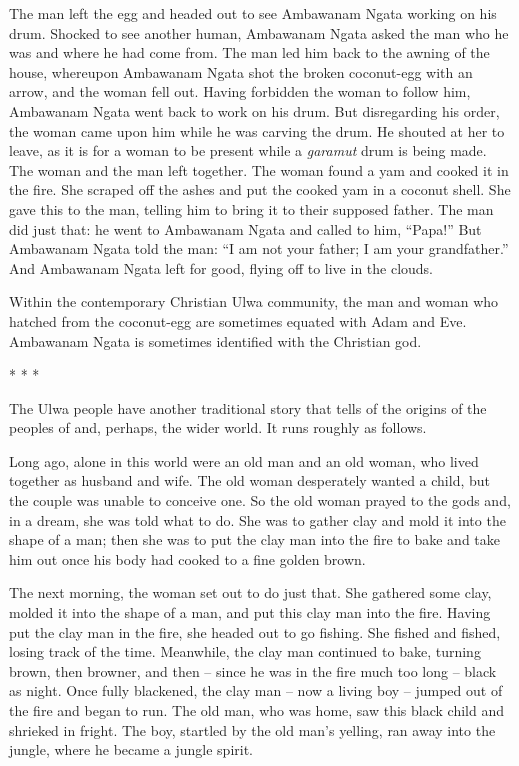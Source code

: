   The man left the egg and headed out to see Ambawanam Ngata working on his drum. Shocked to see another human, Ambawanam Ngata asked the man who he was and where he had come from. The man led him back to the awning of the house, whereupon Ambawanam Ngata shot the broken coconut-egg with an arrow, and the woman fell out. Having forbidden the woman to follow him, Ambawanam Ngata went back to work on his drum. But disregarding his order, the woman came upon him while he was carving the drum. He shouted at her to leave, as it is  for a woman to be present while a \textit{garamut} drum is being made. The woman and the man left together. The woman found a yam and cooked it in the fire. She scraped off the ashes and put the cooked yam in a coconut shell. She gave this to the man, telling him to bring it to their supposed father. The man did just that: he went to Ambawanam Ngata and called to him, “Papa!” But Ambawanam Ngata told the man: “I am not your father; I am your grandfather.” And Ambawanam Ngata left for good, flying off to live in the clouds.

  Within the contemporary Christian Ulwa community, the man and woman who hatched from the coconut-egg are sometimes equated with Adam and Eve. Ambawanam Ngata is sometimes identified with the Christian god.

\bigskip
\noindent
* * *

\bigskip
\noindent
The Ulwa people have another traditional story that tells of the origins of the peoples of  and, perhaps, the wider world. It runs roughly as follows.

  Long ago, alone in this world were an old man and an old woman, who lived together as husband and wife. The old woman desperately wanted a child, but the couple was unable to conceive one. So the old woman prayed to the gods and, in a dream, she was told what to do. She was to gather clay and mold it into the shape of a man; then she was to put the clay man into the fire to bake and take him out once his body had cooked to a fine golden brown.

  The next morning, the woman set out to do just that. She gathered some clay, molded it into the shape of a man, and put this clay man into the fire. Having put the clay man in the fire, she headed out to go fishing. She fished and fished, losing track of the time. Meanwhile, the clay man continued to bake, turning brown, then browner, and then -- since he was in the fire much too long -- black as night. Once fully blackened, the clay man -- now a living boy -- jumped out of the fire and began to run. The old man, who was home, saw this black child and shrieked in fright. The boy, startled by the old man’s yelling, ran away into the jungle, where he became a jungle spirit.

